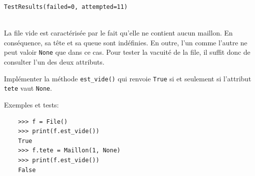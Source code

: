 \documentclass[a4paper,17pt]{extarticle}
\makeatletter
\newenvironment{eleve}%
{\begin{activite}\color{noiramu}\\[-0.5cm]}
{\end{activite}}
\newcommand{\boxspacing}{\kern\kvtcb@left@rule\kern\kvtcb@boxsep}
\newcommand{\prompt}[4]{
        \ttfamily\llap{{\color{#2}[#3]:\hspace{3pt}#4}}\vspace{-\baselineskip}
    }
\makeatother
\begin{document}
            \begin{tcolorbox}[breakable, size=fbox, boxrule=.5pt, pad at break*=1mm, opacityfill=0]
\prompt{Out}{outcolor}{6}{\boxspacing}
\begin{Verbatim}[commandchars=\\\{\}]
TestResults(failed=0, attempted=11)
\end{Verbatim}
\end{tcolorbox}
        \begin{eleve}
    La file vide est caractérisée par le fait qu'elle ne contient aucun
maillon. En conséquence, sa tête et sa queue sont indéfinies. En outre,
l'un comme l'autre ne peut valoir \texttt{None} que dans ce cas. Pour
tester la vacuité de la file, il suffit donc de consulter l'un des deux
attributs.

Implémenter la méthode \texttt{est\_vide()} qui renvoie \texttt{True} si
et seulement si l'attribut \texttt{tete} vaut \texttt{None}.

Exemples et tests:

\begin{verbatim}
    >>> f = File()
    >>> print(f.est_vide())
    True
    >>> f.tete = Maillon(1, None)
    >>> print(f.est_vide())
    False
\end{verbatim}
        
        \end{eleve}
\end{document}
